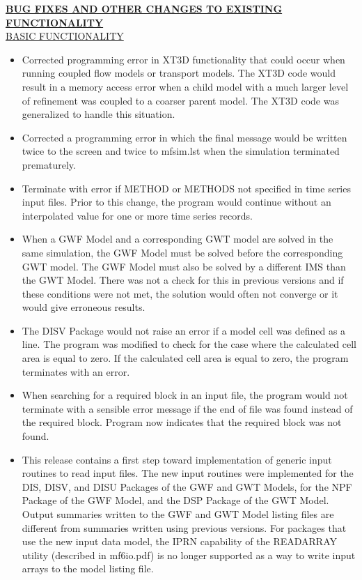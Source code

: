\documentclass[11pt,twoside,twocolumn]{usgsreport}
\begin{document}
\begin{itemize}
	\textbf{\underline{BUG FIXES AND OTHER CHANGES TO EXISTING FUNCTIONALITY}} \\
	\underline{BASIC FUNCTIONALITY}
	\begin{itemize}
		\item Corrected programming error in XT3D functionality that could occur when running coupled flow models or transport models.  The XT3D code would result in a memory access error when a child model with a much larger level of refinement was coupled to a coarser parent model.  The XT3D code was generalized to handle this situation. 
		\item Corrected a programming error in which the final message would be written twice to the screen and twice to mfsim.lst when the simulation terminated prematurely. 
		\item Terminate with error if METHOD or METHODS not specified in time series input files.  Prior to this change, the program would continue without an interpolated value for one or more time series records.
		\item When a GWF Model and a corresponding GWT model are solved in the same simulation, the GWF Model must be solved before the corresponding GWT model.  The GWF Model must also be solved by a different IMS than the GWT Model.  There was not a check for this in previous versions and if these conditions were not met, the solution would often not converge or it would give erroneous results.
		\item The DISV Package would not raise an error if a model cell was defined as a line.  The program was modified to check for the case where the calculated cell area is equal to zero.  If the calculated cell area is equal to zero, the program terminates with an error.
		\item When searching for a required block in an input file, the program would not terminate with a sensible error message if the end of file was found instead of the required block.  Program now indicates that the required block was not found.
		\item This release contains a first step toward implementation of generic input routines to read input files.  The new input routines were implemented for the DIS, DISV, and DISU Packages of the GWF and GWT Models, for the NPF Package of the GWF Model, and the DSP Package of the GWT Model.  Output summaries written to the GWF and GWT Model listing files are different from summaries written using previous versions.  For packages that use the new input data model, the IPRN capability of the READARRAY utility (described in mf6io.pdf) is no longer supported as a way to write input arrays to the model listing file.
	\end{itemize}


\end{itemize}
\end{document}
